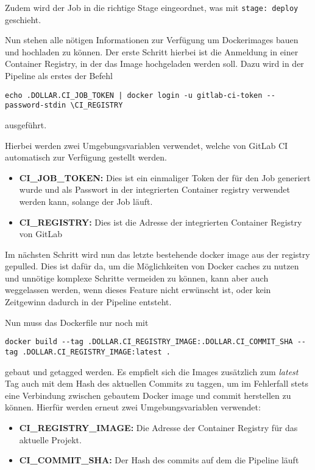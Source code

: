 Zudem wird der Job in die richtige Stage eingeordnet, was mit \texttt{stage: deploy} geschieht.

Nun stehen alle nötigen Informationen zur Verfügung um Dockerimages bauen und hochladen zu können.
Der erste Schritt hierbei ist die Anmeldung in einer Container Registry, in der das Image hochgeladen werden soll.
Dazu wird in der Pipeline als erstes der Befehl
\begin{verbatim}
echo .DOLLAR.CI_JOB_TOKEN | docker login -u gitlab-ci-token --password-stdin \CI_REGISTRY
\end{verbatim}
ausgeführt.

Hierbei werden zwei Umgebungsvariablen verwendet, welche von GitLab CI automatisch zur Verfügung gestellt werden.~\cite{PredefinedVariablesReference}
\begin{itemize}
    \item \textbf{CI\_JOB\_TOKEN:} Dies ist ein einmaliger Token der für den Job generiert wurde und als Passwort in der integrierten Container registry verwendet werden kann, solange der Job läuft.
    \item \textbf{CI\_REGISTRY:} Dies ist die Adresse der integrierten Container Registry von GitLab
\end{itemize}

Im nächsten Schritt wird nun das letzte bestehende docker image aus der registry gepulled.
Dies ist dafür da, um die Möglichkeiten von Docker caches zu nutzen und unnötige komplexe Schritte vermeiden zu können, kann aber auch weggelassen werden, wenn dieses Feature nicht erwünscht ist, oder kein Zeitgewinn dadurch in der Pipeline entsteht.

Nun muss das Dockerfile nur noch mit
\begin{verbatim}
docker build --tag .DOLLAR.CI_REGISTRY_IMAGE:.DOLLAR.CI_COMMIT_SHA --tag .DOLLAR.CI_REGISTRY_IMAGE:latest .
\end{verbatim}

gebaut und getagged werden.
Es empfielt sich die Images zusätzlich zum \textit{latest} Tag auch mit dem Hash des aktuellen Commits zu taggen, um im Fehlerfall stets eine Verbindung zwischen gebautem Docker image und commit herstellen zu können.
Hierfür werden erneut zwei Umgebungsvariablen verwendet:\cite{PredefinedVariablesReference}
\begin{itemize}
    \item \textbf{CI\_REGISTRY\_IMAGE:} Die Adresse der Container Registry für das aktuelle Projekt.
    \item \textbf{CI\_COMMIT\_SHA:} Der Hash des commits auf dem die Pipeline läuft
\end{itemize}

